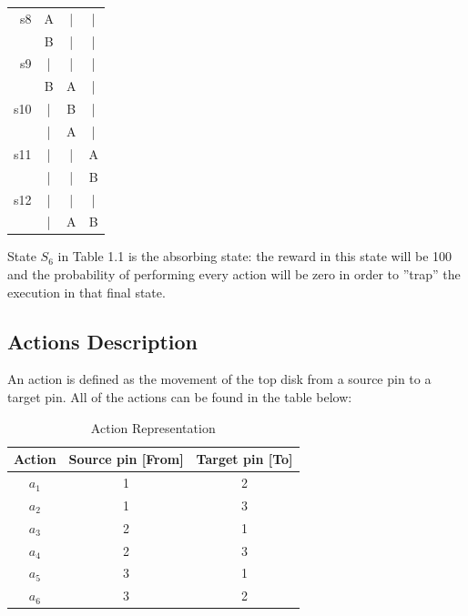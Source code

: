 \documentclass[11pt]{article}
\numberwithin{equation}{section}
\numberwithin{table}{section}
\numberwithin{figure}{secation}
\begin{document}
{\begin{table}[!htb]
\begin{minipage}{.5\linewidth}
\begin{tabular}{|r|ccc|}
        s8   &A   &| &|     \\ 
             &B   &| &|     \\ \hline
             
        s9   &|   &| &|     \\ 
             &B   &A &|     \\ \hline 
             
        s10   &|   &B &|     \\ 
             &|   &A &|     \\ \hline 
             
        s11  &|   &| &A     \\ 
             &|   &| &B    \\ \hline
             
        s12  &|   &| &|     \\ 
             &|   &A &B     \\ \hline
        \end{tabular}
    \end{minipage} 
\end{table}
              
State $S_{6}$ in Table 1.1 is the absorbing state: the reward in this state will be 100 and the probability of performing every action will be zero in order to ''trap'' the execution in that final state.

		\subsection{Actions  Description}
        An action is defined as the movement of the top disk from a source pin to a target pin. All of the actions can be found in the table below:
        
        \begin{table}[!htb]
            \caption{Action Representation}
            \begin{tabular}{|c|c|c|} \hline
            Action & Source pin [From] & Target pin [To] \\ \hline
            $a_{1}$ & 1 & 2 \\ 
            $a_{2}$ & 1 & 3 \\ 
            $a_{3}$ & 2 & 1 \\ 
            $a_{4}$ & 2 & 3 \\ 
            $a_{5}$ & 3 & 1 \\ 
            $a_{6}$ & 3 & 2 \\ \hline
            \end{tabular}
        \end{table}
		
}
\end{document}
